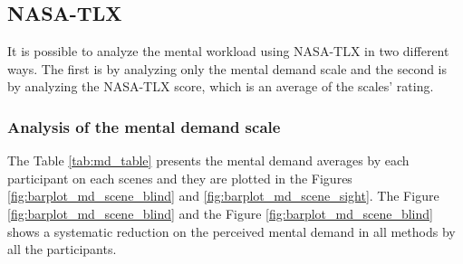 \subsection{NASA-TLX}
\label{subsec:results_nasa_tlx}

It is possible to analyze the mental workload using NASA-TLX in two different ways. The first is by analyzing only the mental demand scale and the second is by analyzing the NASA-TLX score, which is an average of the scales' rating.

\subsubsection{Analysis of the mental demand scale}

The Table \ref{tab:md_table} presents the mental demand averages by each participant on each scenes and they are plotted in the Figures \ref{fig:barplot_md_scene_blind} and \ref{fig:barplot_md_scene_sight}. The Figure \ref{fig:barplot_md_scene_blind} and the Figure \ref{fig:barplot_md_scene_blind} shows a systematic reduction on the perceived mental demand in all methods by all the participants.


%
%

